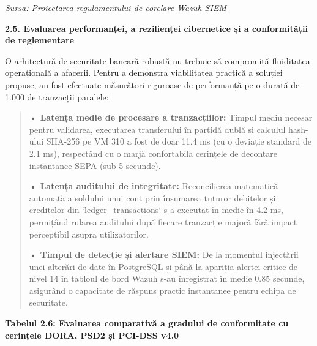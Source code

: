 \documentclass[
]{article}
\begin{document}
\emph{Sursa: Proiectarea regulamentului de corelare Wazuh SIEM}

\textbf{2.5. Evaluarea performanței, a rezilienței cibernetice și a
conformității de reglementare}

O arhitectură de securitate bancară robustă nu trebuie să compromită
fluiditatea operațională a afacerii. Pentru a demonstra viabilitatea
practică a soluției propuse, au fost efectuate măsurători riguroase de
performanță pe o durată de 1.000 de tranzacții paralele:

\begin{quote}
\textbf{• Latența medie de procesare a tranzacțiilor:} Timpul mediu
necesar pentru validarea, executarea transferului în partidă dublă și
calculul hash-ului SHA-256 pe VM 310 a fost de doar 11.4 ms (cu o
deviație standard de 2.1 ms), respectând cu o marjă confortabilă
cerințele de decontare instantanee SEPA (sub 5 secunde).

\textbf{• Latența auditului de integritate:} Reconcilierea matematică
automată a soldului unui cont prin însumarea tuturor debitelor și
creditelor din `ledger\_transactions` s-a executat în medie în 4.2 ms,
permițând rularea auditului după fiecare tranzacție majoră fără impact
perceptibil asupra utilizatorilor.

\textbf{• Timpul de detecție și alertare SIEM:} De la momentul
injectării unei alterări de date în PostgreSQL și până la apariția
alertei critice de nivel 14 în tabloul de bord Wazuh s-au înregistrat în
medie 0.85 secunde, asigurând o capacitate de răspuns practic
instantanee pentru echipa de securitate.
\end{quote}

\textbf{Tabelul 2.6: Evaluarea comparativă a gradului de conformitate cu
cerințele DORA, PSD2 și PCI-DSS v4.0}
\end{document}
